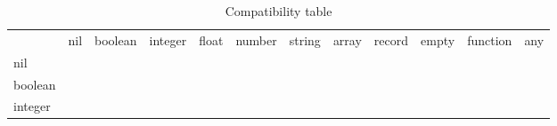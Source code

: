 \begin{table}[!h]
    \caption{Compatibility table}
    \tiny
 \begin{tabular}{ m{1.1cm} m{0.95cm} m{0.95cm} m{0.95cm} m{0.95cm} m{0.95cm} m{0.95cm} m{0.95cm} m{0.95cm} m{0.95cm} m{0.95cm} m{0.95cm}} 

            & nil                                           & boolean                                                              & integer                                       & float                                         & number                                        & string                                        & array                                         & record                                        & empty                                         & function                                      & any                   \\ \cline{2-12} 
\multicolumn{1}{l|}{nil}      & \multicolumn{1}{l|}{\cellcolor[HTML]{036400}} & \multicolumn{1}{l|}{\cellcolor[HTML]{036400}{\color[HTML]{000000} }} & \multicolumn{1}{l|}{\cellcolor[HTML]{036400}} & \multicolumn{1}{l|}{\cellcolor[HTML]{036400}} & \multicolumn{1}{l|}{\cellcolor[HTML]{036400}} & \multicolumn{1}{l|}{\cellcolor[HTML]{036400}} & \multicolumn{1}{l|}{\cellcolor[HTML]{036400}} & \multicolumn{1}{l|}{\cellcolor[HTML]{036400}} & \multicolumn{1}{l|}{\cellcolor[HTML]{036400}} & \multicolumn{1}{l|}{\cellcolor[HTML]{FFFFFF}} & \multicolumn{1}{l|}{} \\ \cline{2-12} 
\multicolumn{1}{l|}{boolean}  & \multicolumn{1}{l|}{\cellcolor[HTML]{036400}} & \multicolumn{1}{l|}{\cellcolor[HTML]{036400}}                        & \multicolumn{1}{l|}{}                         & \multicolumn{1}{l|}{}                         & \multicolumn{1}{l|}{}                         & \multicolumn{1}{l|}{}                         & \multicolumn{1}{l|}{}                         & \multicolumn{1}{l|}{}                         & \multicolumn{1}{l|}{}                         & \multicolumn{1}{l|}{}                         & \multicolumn{1}{l|}{} \\ \cline{2-12} 
\multicolumn{1}{l|}{integer}  & \multicolumn{1}{l|}{\cellcolor[HTML]{036400}} & \multicolumn{1}{l|}{}                                                & \multicolumn{1}{l|}{\cellcolor[HTML]{036400}} & \multicolumn{1}{l|}{\cellcolor[HTML]{036400}} & \multicolumn{1}{l|}{\cellcolor[HTML]{036400}} & \multicolumn{1}{l|}{}                         & \multicolumn{1}{l|}{}                         & \multicolumn{1}{l|}{}                         & \multicolumn{1}{l|}{}                         & \multicolumn{1}{l|}{}                         & \multicolumn{1}{l|}{} \\ \cline{2-12} 

\end{tabular}
\end{table}
